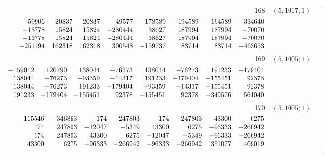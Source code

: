 \documentclass[11pt]{article}
\theoremstyle{remark}
\numberwithin{equation}{section}
\begin{document}
\begin{longtable}{rcl}
168 & $(5,1017;1)$ & \begin{tabular}[t]{@{}l@{}}$w_i=\displaystyle \frac{3015401203760311}{1583659543843563600000000000000000}$\\[3pt]{\scriptsize$\begin{array}{@{}rrrrrrrr@{}}59906 & 20837 & 20837 & 49577 & -178589 & -194589 & -194589 & 334640\\-13778 & 15824 & 15824 & -280444 & 38627 & 187994 & 187994 & -70070\\-13778 & 15824 & 15824 & -280444 & 38627 & 187994 & 187994 & -70070\\-251194 & 162318 & 162318 & 300548 & -159737 & 83714 & 83714 & -463653\end{array}$}\end{tabular}\\[8pt]
169 & $(5,1005;1)$ & \begin{tabular}[t]{@{}l@{}}$w_i=\displaystyle \frac{9678446144470417}{47417889785226202000000000000000000}$\\[3pt]{\scriptsize$\begin{array}{@{}rrrrrrrr@{}}-159012 & 120790 & 138044 & -76273 & 138044 & -76273 & 191233 & -179404\\138044 & -76273 & -93359 & -14317 & 191233 & -179404 & -155451 & 92378\\138044 & -76273 & 191233 & -179404 & -93359 & -14317 & -155451 & 92378\\191233 & -179404 & -155451 & 92378 & -155451 & 92378 & -349576 & 561040\end{array}$}\end{tabular}\\[8pt]
170 & $(5,1005;1)$ & \begin{tabular}[t]{@{}l@{}}$w_i=\displaystyle \frac{9383199707071869}{5921019061991586250000000000000000}$\\[3pt]{\scriptsize$\begin{array}{@{}rrrrrrrr@{}}-115546 & -346863 & 174 & 247803 & 174 & 247803 & 43300 & 6275\\174 & 247803 & -12047 & -5349 & 43300 & 6275 & -96333 & -266942\\174 & 247803 & 43300 & 6275 & -12047 & -5349 & -96333 & -266942\\43300 & 6275 & -96333 & -266942 & -96333 & -266942 & 351077 & 409019\end{array}$}\end{tabular}\\[8pt]

\end{longtable}
\end{document}
